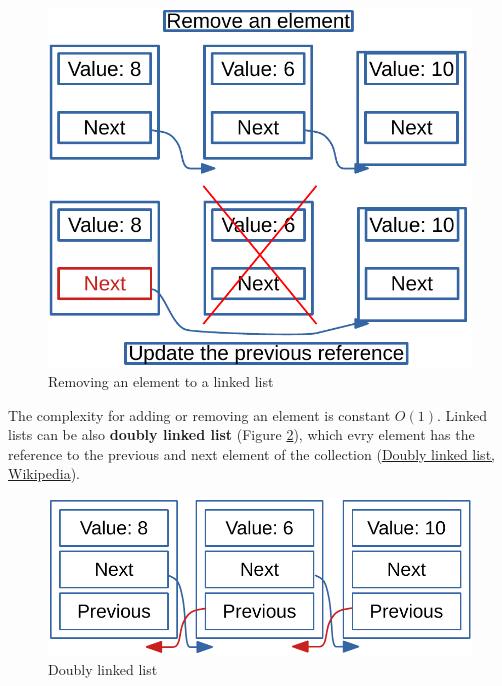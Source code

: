 \begin{figure}[H]
	\begin{center}
		\includegraphics[scale=.6]{chapters/datastructures/images/linked_list_3.pdf}
		\caption[Removing an element to a linked list]{Removing an element to a linked list}
		\label{linked_list_3}
	\end{center}
\end{figure}
The complexity for adding or removing an element is constant \(O(1)\).
Linked lists can be also \textbf{doubly linked list} (Figure \ref{linked_list_4}), which evry element has the reference to the previous and next element of the collection \cite{wikidoublylinkedlist} (\href{https://en.wikipedia.org/wiki/Doubly_linked_list}{Doubly linked list, Wikipedia}).
\begin{figure}[H]
	\begin{center}
		\includegraphics[scale=.6]{chapters/datastructures/images/linked_list_4.pdf}
		\caption[Doubly linked list]{Doubly linked list}
		\label{linked_list_4}
	\end{center}
\end{figure} 

